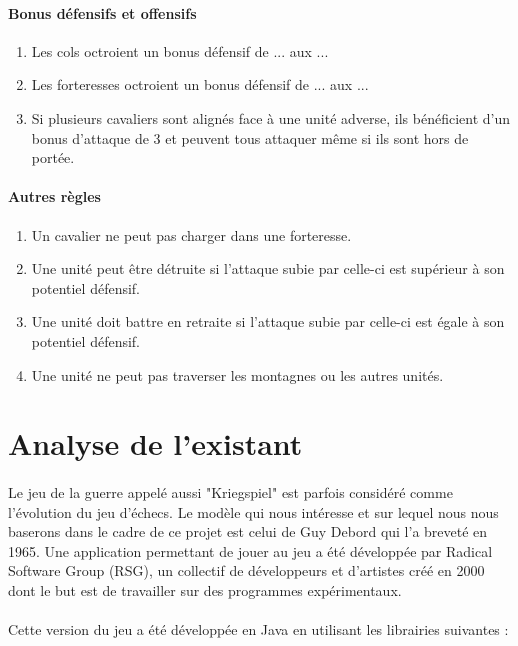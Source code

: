 \documentclass[12pt]{article}
\begin{document}
		\paragraph{Bonus défensifs et offensifs}
		\begin{enumerate}
		\item Les cols octroient un bonus défensif de ... aux ...
		\item Les forteresses octroient un bonus défensif de ... aux ...
		\item Si plusieurs cavaliers sont alignés face à une unité adverse, ils bénéficient d'un bonus d'attaque de 3 et peuvent tous attaquer même si ils sont hors de portée.
		\end{enumerate}
		
		\paragraph{Autres règles}
		\begin{enumerate}
		\item Un cavalier ne peut pas charger dans une forteresse.
		\item Une unité peut être détruite si l'attaque subie par celle-ci est supérieur à son potentiel défensif.
		\item Une unité doit battre en retraite si l'attaque subie par celle-ci est égale à son potentiel défensif.
		\item Une unité ne peut pas traverser les montagnes ou les autres unités.
		\end{enumerate}
		\clearpage

	\section{Analyse de l'existant}    

		\paragraph{}
		Le jeu de la guerre appelé aussi "Kriegspiel" est parfois considéré comme l'évolution du jeu d'échecs.
		Le modèle qui nous intéresse et sur lequel nous nous baserons dans le cadre de ce projet est celui de Guy Debord qui l'a breveté en 1965.
		Une application permettant de jouer au jeu a été développée par Radical Software Group (RSG), un collectif de développeurs et d'artistes 
		créé en 2000 dont le but est de travailler sur des programmes expérimentaux.
		
		\paragraph{}
		Cette version du jeu a été développée en Java en utilisant les librairies suivantes :
		
\end{document}
